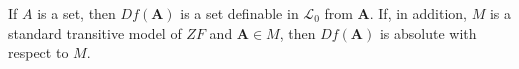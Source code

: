 If $A$ is a set, then $Df(\mathbf{A})$ is a set definable in $\mathcal{L}_0$ from $\mathbf{A}$. If, in addition, $M$ is a standard transitive model of $ZF$ and $\mathbf{A} \in M$, then $Df(\mathbf{A})$ is absolute with respect to $M$.
